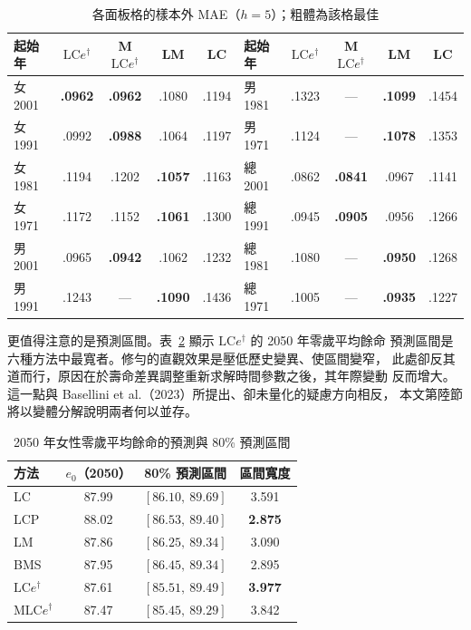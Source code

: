 \documentclass[UTF8, fontset=macnew, a4paper, 12pt]{ctexart}
\newcommand{\LCe}{\mathrm{LC}e^{\dagger}}
\begin{document}
\begin{table}[H]
\centering
\caption{各面板格的樣本外 MAE（$h=5$）；粗體為該格最佳}
\small
\begin{tabular}{lcccc@{\hspace{14pt}}lcccc}
\toprule
起始年 & $\LCe$ & M$\LCe$ & LM & LC & 起始年 & $\LCe$ & M$\LCe$ & LM & LC\\
\midrule
女 2001 & \textbf{.0962} & \textbf{.0962} & .1080 & .1194 & 男 1981 & .1323 & --- & \textbf{.1099} & .1454\\
女 1991 & .0992 & \textbf{.0988} & .1064 & .1197 & 男 1971 & .1124 & --- & \textbf{.1078} & .1353\\
女 1981 & .1194 & .1202 & \textbf{.1057} & .1163 & 總 2001 & .0862 & \textbf{.0841} & .0967 & .1141\\
女 1971 & .1172 & .1152 & \textbf{.1061} & .1300 & 總 1991 & .0945 & \textbf{.0905} & .0956 & .1266\\
男 2001 & .0965 & \textbf{.0942} & .1062 & .1232 & 總 1981 & .1080 & --- & \textbf{.0950} & .1268\\
男 1991 & .1243 & --- & \textbf{.1090} & .1436 & 總 1971 & .1005 & --- & \textbf{.0935} & .1227\\
\bottomrule
\end{tabular}
\label{tab:panel}
\end{table}

更值得注意的是預測區間。表~\ref{tab:e0} 顯示 $\LCe$ 的 2050 年零歲平均餘命
預測區間是六種方法中最寬者。修勻的直觀效果是壓低歷史變異、使區間變窄，
此處卻反其道而行，原因在於壽命差異調整重新求解時間參數之後，其年際變動
反而增大。這一點與 Basellini et al.（2023）所提出、卻未量化的疑慮方向相反，
本文第陸節將以變體分解說明兩者何以並存。

\begin{table}[H]
\centering
\caption{2050 年女性零歲平均餘命的預測與 80\% 預測區間}
\small
\begin{tabular}{lccc}
\toprule
方法 & $e_0$（2050） & 80\% 預測區間 & 區間寬度\\
\midrule
LC      & 87.99 & $[86.10,\ 89.69]$ & 3.591\\
LCP     & 88.02 & $[86.53,\ 89.40]$ & \textbf{2.875}\\
LM      & 87.86 & $[86.25,\ 89.34]$ & 3.090\\
BMS     & 87.95 & $[86.45,\ 89.34]$ & 2.895\\
$\LCe$  & 87.61 & $[85.51,\ 89.49]$ & \textbf{3.977}\\
M$\LCe$ & 87.47 & $[85.45,\ 89.29]$ & 3.842\\
\bottomrule
\end{tabular}
\label{tab:e0}
\end{table}
\end{document}
